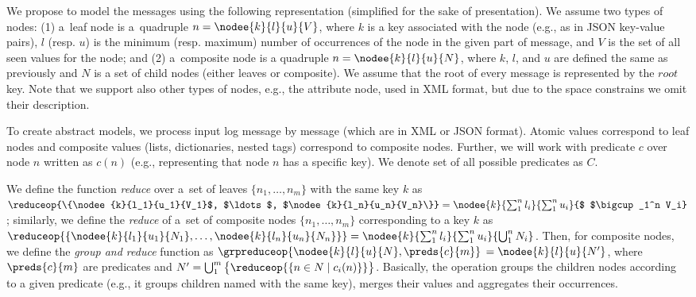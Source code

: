 {We propose to model the messages using the following representation (simplified
for the sake of presentation).
%
%
We assume two types of nodes: (1) a~leaf node is a~quadruple $n =
\nodee{k}{l}{u}{V}$, where $k$ is a key associated with the node (e.g., as in
JSON key-value pairs), $l$ (resp. $u$) is the minimum (resp. maximum) number of
occurrences of the node in the given part of message, and $V$ is the set of all
seen values for the node; and (2) a~composite node is a quadruple $n =
\nodee{k}{l}{u}{N}$, where $k$, $l$, and $u$ are defined the same as previously
and $N$ is a set of child nodes (either leaves or composite).
%
We assume that the root of every message is represented by the
$root$ key.
%
Note that we support also other types of nodes, e.g., the attribute node, used
in XML format, but due to the space constrains we omit their description.

To create abstract models, we process input log message by message (which are in
XML or JSON format). 
%
Atomic values correspond to leaf nodes and composite values (lists,
dictionaries, nested tags) correspond to composite nodes.
%
Further, we will work with predicate $c$ over node $n$ written as $c(n)$
(e.g., representing that node $n$ has a specific key). We denote set of
all possible predicates as $C$.

We define the function \emph{reduce} over a~set of leaves $\{n_1,\ldots,n_m\}$
with the same key $k$ as $\reduceop{\{\nodee{k}{l_1}{u_1}{V_1}$, $\ldots$,
$\nodee{k}{l_n}{u_n}{V_n}\}} = \nodee{k}{\sum_1^n l_i}{\sum_1^n u_i}{$
$\bigcup_1^n V_i}$; similarly,  we define the \emph{reduce} of a~set of
composite nodes $\{n_1,\ldots,n_m\}$ corresponding to a key $k$ as
$\reduceop{\{ \nodee{k}{l_1}{u_1}{N_1}, \ldots, \nodee{k}{l_n}{u_n}{N_n}\}} =
\nodee{k}{\sum_1^n l_i}{\sum_1^n u_i}{\bigcup_1^n N_i}$.  
%
Then, for composite nodes, we define the \emph{group and reduce} function as
$\grpreduceop{\nodee{k}{l}{u}{N},\preds{c}{m}}$ $= \nodee{k}{l}{u}{N'}$, where
$\preds{c}{m}$ are predicates and $N' = \bigcup_1^m \big\{ \reduceop{\{n \in N \mid
c_i(n)\}}\big\}$.
%
Basically, the operation groups the children nodes according to a given
predicate (e.g., it groups children named with the same key), merges their
values and aggregates their occurrences.

}
